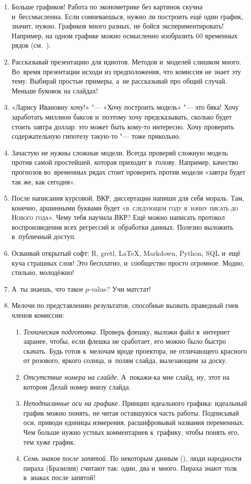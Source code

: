 \documentclass[final,pdftex]{../../template/epsilonj}
\begin{document}
\begin{enumerate}
	\item Больше графиков! Работа по эконометрике без картинок скучна и~бессмысленна. Если сомневаешься, нужно ли построить ещё один график, значит, нужно. Графиков много разных, не бойся экспериментировать! Например, на одном графике можно осмысленно изобразить 60 временных рядов (см.~\cite{mvtsplot}). 
	\item Рассказывай презентацию для идиотов. Методов и~моделей слишком много. Во~время презентации исходи из предположения, что комиссия не знает эту тему. Выбирай простые примеры, а~не рассказывай про общий случай. Меньше буковок на слайдах! 
	\item «Ларису Ивановну хочу!» "--- «Хочу построить модель» "--- это бяка! Хочу заработать миллион баксов и~поэтому хочу предсказывать, сколько будет стоить завтра доллар: это может быть кому-то интересно. Хочу проверить содержательную гипотезу такую-то "--- тоже прикольно.
	\item Зачастую не нужны сложные модели. Всегда проверяй сложную модель против самой простейшей, которая приходит в~голову. Например, качество прогнозов во~временных рядах стоит проверить против модели «завтра будет так же, как сегодня». 
	\item После написания курсовой, ВКР, диссертации напиши для себя мораль. Там, конечно, аршинными буквами будет «\textsc{в~следующем году я~начну писать до Нового года}». Чему тебя научила ВКР? Ещё можно написать протокол воспроизведения всех регрессий и~обработки данных. Полезно выложить в~публичный доступ. 
	\item Осваивай открытый софт: R\textbf{\textbf{}}, gretl, \LaTeX, Markdown, Python, SQL и~ещё куча страшных слов! Это бесплатно, и~сообщество просто огромное. Модно, стильно, молодёжно! 
	\item А~ты знаешь, что такое $p$-value? Учи матстат! 
	\item Мелочи по представлению результатов, способные вызвать праведный гнев членов комиссии:
	\begin{enumerate}
		\item \textit{Техническая подготовка.} Проверь флешку, выложи файл в~интернет заранее, чтобы, если флешка не сработает, его можно было быстро скачать. Будь готов к~мелочам вроде проектора, не отличающего красного от розового, яркого солнца, и~полям слайда, вылезающим за доску. 
		\item \textit{Отсутствие номера на слайде.} А~покажи-ка мне слайд, ну, этот\ldotst{} на котором\ldotst{} Делай номер внизу слайда.
		\item \textit{Неподписанные оси на графике.} Принцип идеального графика: идеальный график можно понять, не читая оставшуюся часть работы. Подписывай оси, приводи единицы измерения, расшифровывай названия переменных. Чем больше нужно устных комментариев к~графику, чтобы понять его, тем хуже график.
		\item \textit{Семь знаков после запятой.} По некоторым данным (\cite{piraha2008}), люди народности пираха (Бразилия) считают так: один, два и~много. Пираха знают толк в~знаках после запятой!
	\end{enumerate}
\end{enumerate}

\printbibliography
\end{document}
